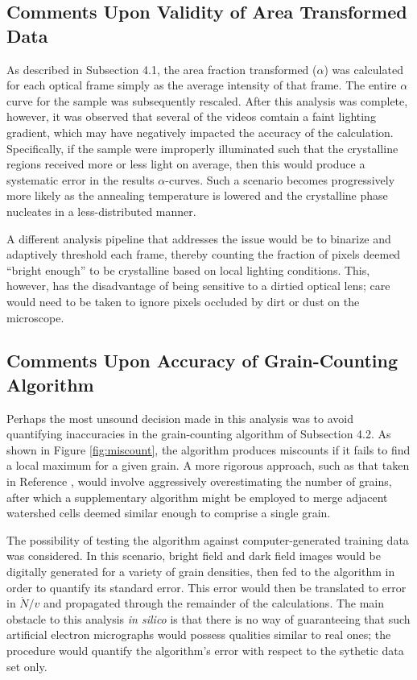 \subsection{Comments Upon Validity of Area Transformed Data}

As described in Subsection 4.1, the area fraction transformed ($\alpha$) was calculated for each optical frame simply as the average intensity of that frame.  The entire $\alpha$ curve for the sample was subsequently rescaled.  After this analysis was complete, however, it was observed that several of the videos comtain a faint lighting gradient, which may have negatively impacted the accuracy of the calculation.  Specifically, if the sample were improperly illuminated such that the crystalline regions received more or less light on average, then this would produce a systematic error in the results $\alpha$-curves.  Such a scenario becomes progressively more likely as the annealing temperature is lowered and the crystalline phase nucleates in a less-distributed manner.

A different analysis pipeline that addresses the issue would be to binarize and adaptively threshold each frame, thereby counting the fraction of pixels deemed ``bright enough'' to be crystalline based on local lighting conditions.  This, however, has the disadvantage of being sensitive to a dirtied optical lens; care would need to be taken to ignore pixels occluded by dirt or dust on the microscope. 

\subsection{Comments Upon Accuracy of Grain-Counting Algorithm}

Perhaps the most unsound decision made in this analysis was to avoid quantifying inaccuracies in the grain-counting algorithm of Subsection 4.2.  As shown in Figure \ref{fig:miscount}, the algorithm produces miscounts if it fails to find a local maximum for a given grain.  A more rigorous approach, such as that taken in Reference \cite{campbell:2018}, would involve aggressively overestimating the number of grains, after which a supplementary algorithm might be employed to merge adjacent watershed cells deemed similar enough to comprise a single grain.

The possibility of testing the algorithm against computer-generated training data was considered.  In this scenario, bright field and dark field images would be digitally generated for a variety of grain densities, then fed to the algorithm in order to quantify its standard error.  This error would then be translated to error in $\dot{N}/v$ and propagated through the remainder of the calculations.  The main obstacle to this analysis \textit{in silico} is that there is no way of guaranteeing that such artificial electron micrographs would possess qualities similar to real ones; the procedure would quantify the algorithm's error with respect to the sythetic data set only.

